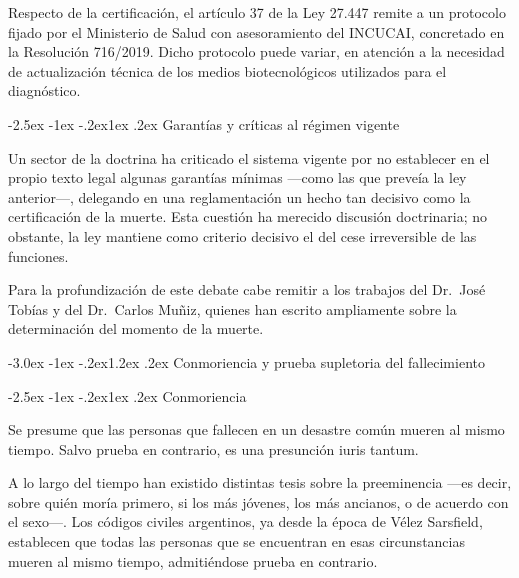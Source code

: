 \documentclass[12pt,oneside]{book}
\makeatletter
\renewcommand\section{\@startsection{section}{1}{\z@}%
  {-3.0ex \@plus -1ex \@minus -.2ex}{1.2ex \@plus .2ex}%
  {\normalfont\large\bfseries\color{acento}}}
\renewcommand\subsection{\@startsection{subsection}{2}{\z@}%
  {-2.5ex \@plus -1ex \@minus -.2ex}{1ex \@plus .2ex}%
  {\normalfont\normalsize\bfseries}}
\makeatother
\begin{document}
Respecto de la certificación, el artículo 37 de la Ley 27.447 remite a un protocolo fijado por el Ministerio de Salud con asesoramiento del INCUCAI, concretado en la Resolución 716/2019. Dicho protocolo puede variar, en atención a la necesidad de actualización técnica de los medios biotecnológicos utilizados para el diagnóstico.

\subsection{Garantías y críticas al régimen vigente}

\begin{importante}
Un sector de la doctrina ha criticado el sistema vigente por no establecer en el propio texto legal algunas garantías mínimas ---como las que preveía la ley anterior---, delegando en una reglamentación un hecho tan decisivo como la certificación de la muerte. Esta cuestión ha merecido discusión doctrinaria; no obstante, la ley mantiene como criterio decisivo el del cese irreversible de las funciones.
\end{importante}

Para la profundización de este debate cabe remitir a los trabajos del Dr.\ José Tobías y del Dr.\ Carlos Muñiz, quienes han escrito ampliamente sobre la determinación del momento de la muerte.

\section{Conmoriencia y prueba supletoria del fallecimiento}

\subsection{Conmoriencia}

\begin{regla}
Se presume que las personas que fallecen en un desastre común mueren al mismo tiempo. Salvo prueba en contrario, es una presunción iuris tantum.
\end{regla}

\begin{nota}
A lo largo del tiempo han existido distintas tesis sobre la preeminencia ---es decir, sobre quién moría primero, si los más jóvenes, los más ancianos, o de acuerdo con el sexo---. Los códigos civiles argentinos, ya desde la época de Vélez Sarsfield, establecen que todas las personas que se encuentran en esas circunstancias mueren al mismo tiempo, admitiéndose prueba en contrario.
\end{nota}
\end{document}
